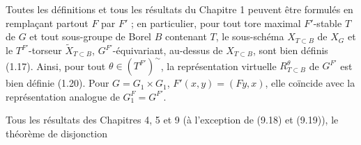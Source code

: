 \documentclass[9pt,twoside]{extarticle}
\begin{document}
{Toutes les définitions et tous les résultats du Chapitre 1 peuvent être formulés en remplaçant partout \(F\) par \(F'\) ; en particulier, pour tout tore maximal \(F'\)-stable \(T\) de \(G\) et tout sous-groupe de Borel \(B\) contenant \(T\), le sous-schéma \(X_{T\subset B}\) de \(X_G\) et le \(T^{F'}\)-torseur \(\widetilde X_{T\subset B}\), \(G^{F'}\)-équivariant, au-dessus de \(X_{T\subset B}\), sont bien définis (1.17). Ainsi, pour tout \(\theta\in(T^{F'})^{\sim}\), la représentation virtuelle \(R_{T\subset B}^\theta\) de \(G^{F'}\) est bien définie (1.20). Pour \(G=G_1\times G_1\), \(F'(x,y)=(Fy,x)\), elle coïncide avec la représentation analogue de \(G_1^F=G^{F'}\).\par

Tous les résultats des Chapitres 4, 5 et 9 (à l'exception de (9.18) et (9.19)), le théorème de disjonction\par
}
\end{document}
